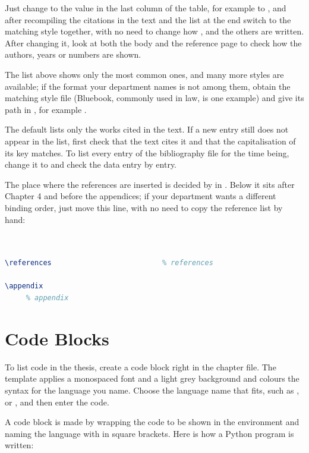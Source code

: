 Just change  to the value in the last column of the table, for example  to , and after recompiling the citations in the text and the list at the end switch to the matching style together, with no need to change how \code{\citep}, \code{\citet} and the others are written. After changing it, look at both the body and the reference page to check how the authors, years or numbers are shown.

The list above shows only the most common ones, and many more styles are available; if the format your department names is not among them, obtain the matching  style file (Bluebook, commonly used in law, is one example) and give its path in , for example .

The default  lists only the works cited in the text. If a new entry still does not appear in the list, first check that the text cites it and that the capitalisation of its key matches. To list every entry of the bibliography file for the time being, change it to  and check the data entry by entry.

The place where the references are inserted is decided by  in . Below it sits after Chapter 4 and before the appendices; if your department wants a different binding order, just move this line, with no need to copy the reference list by hand:

\begin{lstlisting}[language=latex]


\references                          % references

\appendix
     % appendix
\end{lstlisting}

\section{Code Blocks}

To list code in the thesis, create a code block right in the chapter file. The template applies a monospaced font and a light grey background and colours the syntax for the language you name. Choose the language name that fits, such as ,  or , and then enter the code.

A code block is made by wrapping the code to be shown in the  environment and naming the language with  in square brackets. Here is how a Python program is written:

